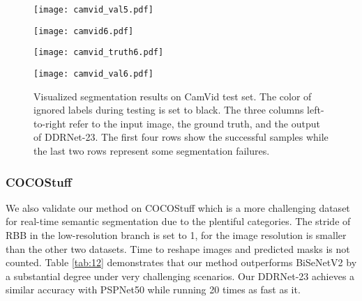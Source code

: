 \documentclass[journal]{IEEEtran}
\begin{document}
\begin{figure}
\begin{minipage}{1.1in}
\end{minipage}
\begin{minipage}{1.1in}
\texttt{[image: camvid\_val5.pdf]}
\end{minipage}
\vspace{0.3em}
\begin{minipage}{1.1in}
\texttt{[image: camvid6.pdf]}
\end{minipage}
\begin{minipage}{1.1in}
\texttt{[image: camvid\_truth6.pdf]}
\end{minipage}
\begin{minipage}{1.1in}
\texttt{[image: camvid\_val6.pdf]}
\end{minipage}
\caption{Visualized segmentation results on CamVid test set. The color of ignored labels during testing is set to black. The three columns left-to-right refer to the input image, the ground truth, and the output of DDRNet-23. The first four rows show the successful samples while the last two rows represent some segmentation failures.}
\label{fig8}
\end{figure}

\subsubsection{COCOStuff}

We also validate our method on COCOStuff which is a more challenging dataset for real-time semantic segmentation due to the plentiful categories. The stride of RBB in the low-resolution branch is set to 1, for the image resolution is smaller than the other two datasets. Time to reshape images and predicted masks is not counted. Table \ref{tab:12} demonstrates that our method outperforms BiSeNetV2 by a substantial degree under very challenging scenarios. Our DDRNet-23 achieves a similar accuracy with PSPNet50 while running 20 times as fast as it.
\end{document}

